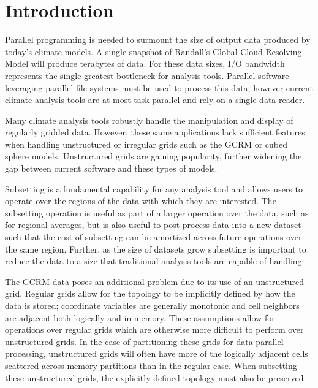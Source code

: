 \section{Introduction}
\label{section:introduction}

Parallel programming is needed to surmount the size of output data produced by
today's climate models.\cite{MODSIM07:LOT}  A single snapshot of Randall's
Global Cloud Resolving Model will produce terabytes of data.\cite{GCRM}  For
these data sizes, I/O bandwidth represents the single greatest bottleneck for
analysis tools.  Parallel software leveraging parallel file systems must be
used to process this data, however current climate analysis tools are at most
task parallel and rely on a single data reader.\cite{CDAT}\cite{CDO}\cite{NCO}

Many climate analysis tools robustly handle the manipulation and display of
regularly gridded data.  However, these same applications lack sufficient
features when handling unstructured or irregular grids such as the GCRM or
cubed sphere models\cite{CUBE}.  Unstructured grids are gaining popularity,
further widening the gap between current software and these types of models.

Subsetting is a fundamental capability for any analysis tool and allows users
to operate over the regions of the data with which they are interested. The
subsetting operation is useful as part of a larger operation over the data,
such as for regional averages, but is also useful to post-process data into a
new dataset such that the cost of subsetting can be amortized across future
operations over the same region. Further, as the size of datasets grow
subsetting is important to reduce the data to a size that traditional analysis
tools are capable of handling. 

The GCRM data poses an additional problem due to its use of an unstructured
grid.  Regular grids allow for the topology to be implicitly defined by how
the data is stored; coordinate variables are generally monotonic and cell
neighbors are adjacent both logically and in memory. These assumptions allow
for operations over regular grids which are otherwise more difficult to
perform over unstructured grids. In the case of partitioning these grids for
data parallel processing, unstructured grids will often have more of the
logically adjacent cells scattered across memory partitions than in the
regular case.  When subsetting these unstructured grids, the explicitly
defined topology must also be preserved.

